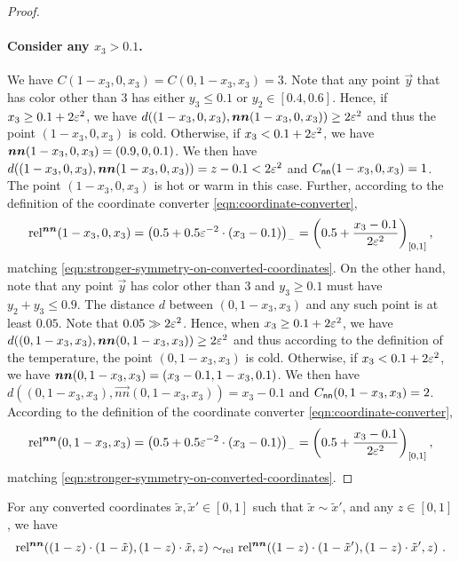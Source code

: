\begin{proof}
    \paragraph{Consider any $x_3>0.1$.}
    We have $C(1-x_3,0,x_3)=C(0,1-x_3,x_3)=3$. 
    Note that any point $\vec{y}$ that has color other than $3$ has either $y_3\leq 0.1$ or $y_2\in [0.4, 0.6]$.
    Hence, if $x_3\geq 0.1+2\varepsilon^2$, we have $d((1-x_3,0,x_3), \operatorname*{\boldsymbol{nn}}(1-x_3,0,x_3))\geq 2\varepsilon^2$ and thus the point $(1-x_3,0,x_3)$ is cold.
    Otherwise, if $x_3<0.1+2\varepsilon^2$, we have $\operatorname*{\boldsymbol{nn}}(1-x_3,0,x_3)=(0.9,0,0.1)$. 
    We then have $d((1-x_3,0,x_3), \boldsymbol{nn}(1-x_3,0,x_3))=z-0.1<2\varepsilon^2$ and $C_{\sf nn}(1-x_3,0,x_3)=1$.
    The point $(1-x_3,0,x_3)$ is hot or warm in this case. 
    Further, according to the definition of the coordinate converter \cref{eqn:coordinate-converter}, 
    \begin{align*}
        \operatorname*{rel^{\boldsymbol{nn}}}(1-x_3,0,x_3) = \left(0.5+0.5\varepsilon^{-2}\cdot (x_3-0.1)\right)_- = \left(0.5+ \frac{x_3-0.1}{2\varepsilon^{2}} \right)_{[0,1]},
    \end{align*}
    matching \cref{eqn:stronger-symmetry-on-converted-coordinates}.
    On the other hand, note that any point $\vec{y}$ has color other than $3$ and $y_3\geq 0.1$ must have $y_2+y_3\leq 0.9$. 
    The distance $d$ between $(0,1-x_3,x_3)$ and any such point is at least $0.05$.
    Note that $0.05\gg 2\varepsilon^2$.
    Hence, when $x_3\geq 0.1+2\varepsilon^2$, we have $d((0,1-x_3,x_3), \operatorname*{\boldsymbol{nn}}(0,1-x_3,x_3))\geq 2\varepsilon^2$ and thus according to 
    the definition of the temperature, 
    the point $(0,1-x_3,x_3)$ is cold. 
    Otherwise, if $x_3<0.1+2\varepsilon^2$, we have $\operatorname*{\boldsymbol{nn}}(0,1-x_3,x_3) = (x_3-0.1,1-x_3,0.1)$. 
    We then have $d((0,1-x_3,x_3), \vec{nn}(0,1-x_3,x_3))=x_3-0.1$ and $C_{\sf nn}(0,1-x_3,x_3)=2$.
    According to the definition of the coordinate converter \cref{eqn:coordinate-converter}, 
    \begin{align*}
        \operatorname*{rel^{\boldsymbol{nn}}}(0,1-x_3,x_3) = \left(0.5+0.5\varepsilon^{-2}\cdot(x_3-0.1)\right)_-  = \left(0.5+ \frac{x_3-0.1}{2\varepsilon^2}\right)_{[0,1]},
    \end{align*}
    matching \cref{eqn:stronger-symmetry-on-converted-coordinates}.
\end{proof}

\begin{corollary}
    \label{lem:converted-equiv-for-converted}
    For any converted coordinates $\tilde{x}, \tilde{x}'\in [0,1]$ such that $\tilde{x}\sim \tilde{x}'$, and any $z\in [0,1]$, we have 
    \begin{align*}
        \operatorname*{rel^{\boldsymbol{nn}}}((1-z)\cdot (1-\tilde{x}), (1-z)\cdot \tilde{x}, z) \,\operatorname*{\sim_{\rm rel}}\, \operatorname*{rel^{\boldsymbol{nn}}}((1-z)\cdot (1-\tilde{x}'), (1-z)\cdot \tilde{x}', z)~.
    \end{align*}
\end{corollary}

